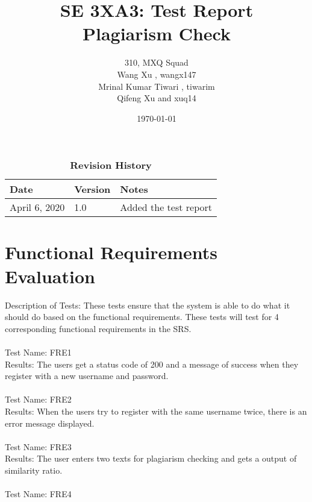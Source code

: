 \documentclass[12pt, titlepage]{article}
\title{SE 3XA3: Test Report\\Plagiarism Check}
\author{310, MXQ Squad
		\\ Wang Xu , wangx147
		\\ Mrinal Kumar Tiwari , tiwarim
		\\ Qifeng Xu and xuq14
}
\date{\today}
\begin{document}
\maketitle

\tableofcontents
\listoftables
\listoffigures

\begin{table}[H]
\caption{\bf Revision History}
\begin{tabularx}{\textwidth}{p{3cm}p{2cm}X}
\toprule {\bf Date} & {\bf Version} & {\bf Notes}\\
\midrule
April 6, 2020 & 1.0 & Added the test report\\

\bottomrule
\end{tabularx}
\end{table}

\newpage



\section{Functional Requirements Evaluation}

Description of Tests: These tests ensure that the system is able to do what it should do based on the functional requirements. These tests will test for 4 corresponding functional requirements in the SRS.\\ \\
	
	Test Name: FRE1 \\
	
	Results: The users get a status code of 200 and a message of success when they register with a new username and password. \\ \\
	
	Test Name: FRE2 \\
	
	Results: When the users try to register with the same username twice, there is an error message displayed. \\ \\
	
	Test Name: FRE3 \\
	
	Results: The user enters two texts for plagiarism checking and gets a output of similarity ratio. \\ \\
	
	Test Name: FRE4 \\
	
\end{document}
